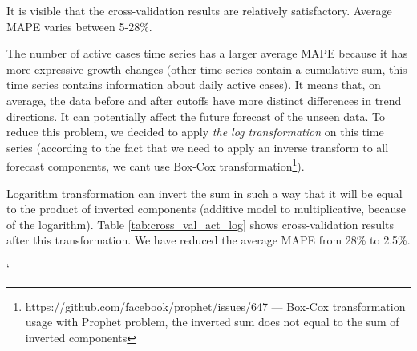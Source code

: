 It is visible that the cross-validation results are relatively satisfactory. Average MAPE varies between 5-28\%. 

The number of active cases time series has a larger average MAPE because it has more expressive growth changes (other time series contain a cumulative sum, this time series contains information about daily active cases). It means that, on average, the data before and after cutoffs have more distinct differences in trend directions. It can potentially affect the future forecast of the unseen data. To reduce this problem, we decided to apply \textit{the log transformation} on this time series (according to the fact that we need to apply an inverse transform to all forecast components, we cant use Box-Cox transformation\footnote{https://github.com/facebook/prophet/issues/647 ---  Box-Cox transformation usage with Prophet problem, the inverted sum does not equal to the sum of inverted components}). 

Logarithm transformation can invert the sum in such a way that it will be equal to the product of inverted components (additive model to multiplicative, because of the logarithm). Table \ref{tab:cross_val_act_log} shows cross-validation results after this transformation. We have reduced the average MAPE from 28\% to 2.5\%. 

\begin{table}[!htb]
\catcode`
\centering
{}
\caption{The best set of the hyperparameters for the number of active cases time series after the logarithm transformation.}
\label{tab:cross_val_act_log}
\end{table}


